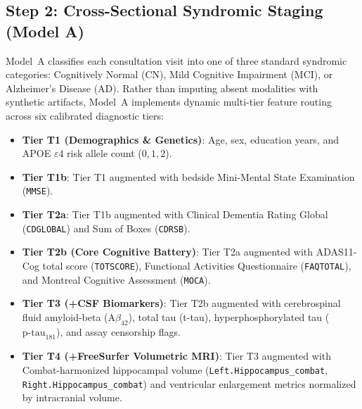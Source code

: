 \documentclass[11pt,a4paper]{article}
\begin{document}
\subsection{Step 2: Cross-Sectional Syndromic Staging (Model A)}
\label{sec:method_stager}
Model~A classifies each consultation visit into one of three standard syndromic categories: Cognitively Normal (CN), Mild Cognitive Impairment (MCI), or Alzheimer's Disease (AD). Rather than imputing absent modalities with synthetic artifacts, Model~A implements dynamic multi-tier feature routing across six calibrated diagnostic tiers:
\begin{itemize}
    \item \textbf{Tier T1 (Demographics \& Genetics)}: Age, sex, education years, and APOE $\varepsilon4$ risk allele count ($0, 1, 2$).
    \item \textbf{Tier T1b}: Tier T1 augmented with bedside Mini-Mental State Examination (\texttt{MMSE}).
    \item \textbf{Tier T2a}: Tier T1b augmented with Clinical Dementia Rating Global (\texttt{CDGLOBAL}) and Sum of Boxes (\texttt{CDRSB}).
    \item \textbf{Tier T2b (Core Cognitive Battery)}: Tier T2a augmented with ADAS11-Cog total score (\texttt{TOTSCORE}), Functional Activities Questionnaire (\texttt{FAQTOTAL}), and Montreal Cognitive Assessment (\texttt{MOCA}).
    \item \textbf{Tier T3 (+CSF Biomarkers)}: Tier T2b augmented with cerebrospinal fluid amyloid-beta ($\text{A}\beta_{42}$), total tau (t-tau), hyperphosphorylated tau ($\text{p-tau}_{181}$), and assay censorship flags.
    \item \textbf{Tier T4 (+FreeSurfer Volumetric MRI)}: Tier T3 augmented with Combat-harmonized hippocampal volume (\texttt{Left.Hippocampus\_combat}, \texttt{Right.Hippocampus\_combat}) and ventricular enlargement metrics normalized by intracranial volume.
\end{itemize}
\end{document}

